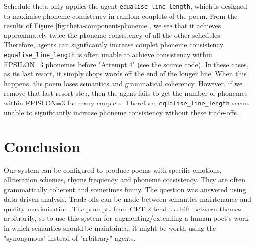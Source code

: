\documentclass[a4paper,10pt]{article}
\begin{document}
Schedule theta only applies the agent \texttt{equalise\_line\_length}, which is designed to maximise phoneme consistency in random couplets of the poem. From the results of Figure \ref{fig:theta-component-phoneme}, we see that it achieves approximately twice the phoneme consistency of all the other schedules. Therefore, agents can significantly increase couplet phoneme consistency. \texttt{equalise\_line\_length} is often unable to achieve consistency within EPSILON=3 phonemes before "Attempt 4" (see the source code). In these cases, as its last resort, it simply chops words off the end of the longer line. When this happens, the poem loses semantics and grammatical coherency. However, if we remove that last resort step, then the agent fails to get the number of phonemes within EPISLON=3 for many couplets. Therefore, \texttt{equalise\_line\_length} seems unable to significantly increase phoneme consistency without these trade-offs.

\section{Conclusion}

Our system can be configured to produce poems with specific emotions, alliteration schemes, rhyme frequency and phoneme consistency. They are often grammatically coherent and sometimes funny. The question was answered using data-driven analysis. Trade-offs can be made between semantics maintenance and quality maximisation. The prompts from GPT-2 tend to drift between themes arbitrarily, so to use this system for augmenting/extending a human poet's work in which semantics should be maintained, it might be worth using the "synonymous" instead of "arbitrary" agents.
\end{document}
